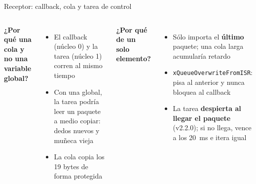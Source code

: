 \documentclass[aspectratio=169,10pt]{beamer}
\begin{document}
\begin{frame}{Receptor: callback, cola y tarea de control}
  \centering
  \vspace{2ex}
  \begin{columns}[T]
    \textbf{¿Por qué una cola y no una variable global?}
    \begin{itemize}\small
      \item El callback (núcleo 0) y la tarea (núcleo 1) corren \alert{al mismo tiempo}
      \item Con una global, la tarea podría leer un paquete a medio copiar: dedos nuevos y muñeca vieja
      \item La cola copia los 19 bytes de forma protegida
    \end{itemize}
    \textbf{¿Por qué de un solo elemento?}
    \begin{itemize}\small
      \item Sólo importa el \textbf{último} paquete; una cola larga acumularía retardo
      \item \texttt{xQueueOverwriteFromISR}: pisa al anterior y nunca bloquea al callback
      \item La tarea \textbf{despierta al llegar el paquete} (v2.2.0); si no llega, vence a los \SI{20}{\milli\second} e itera igual
    \end{itemize}
  \end{columns}
\end{frame}
\end{document}
